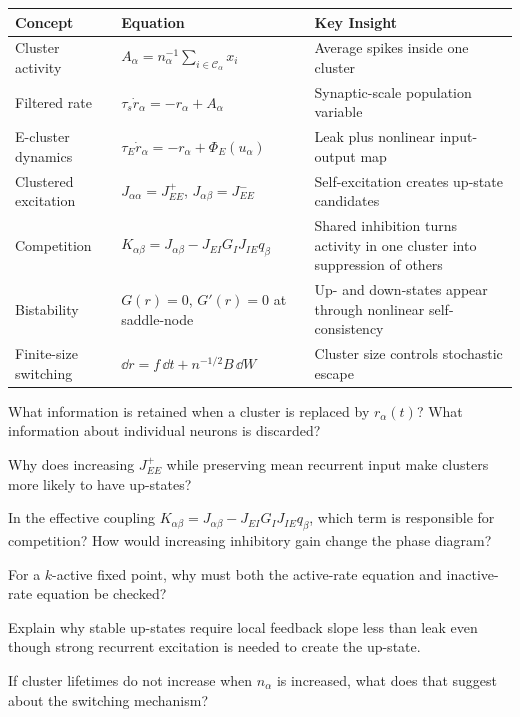 \begin{chaptersummary}

\begin{center}
\renewcommand{\arraystretch}{1.45}
\begin{tabularx}{\textwidth}{@{}l X X@{}}
  \toprule
  \textbf{Concept} & \textbf{Equation} & \textbf{Key Insight} \\
  \midrule
  Cluster activity &
  $A_{\alpha}=n_{\alpha}^{-1}\sum_{i\in\mathcal{C}_{\alpha}}x_i$ &
  Average spikes inside one cluster \\
  Filtered rate &
  $\tau_s\dot r_{\alpha}=-r_{\alpha}+A_{\alpha}$ &
  Synaptic-scale population variable \\
  E-cluster dynamics &
  $\tau_E\dot r_{\alpha}=-r_{\alpha}+\Phi_E(u_{\alpha})$ &
  Leak plus nonlinear input-output map \\
  Clustered excitation &
  $J_{\alpha\alpha}=J_{EE}^{+}$, $J_{\alpha\beta}=J_{EE}^{-}$ &
  Self-excitation creates up-state candidates \\
  Competition &
  $K_{\alpha\beta}=J_{\alpha\beta}-J_{EI}G_I J_{IE}q_{\beta}$ &
  Shared inhibition turns activity in one cluster into suppression of others \\
  Bistability &
  $G(r)=0$, $G'(r)=0$ at saddle-node &
  Up- and down-states appear through nonlinear self-consistency \\
  Finite-size switching &
  $\dd r=f\,\dd t+n^{-1/2}B\,\dd W$ &
  Cluster size controls stochastic escape \\
  \bottomrule
\end{tabularx}
\end{center}

\end{chaptersummary}

\begin{conceptquestions}
  \item What information is retained when a cluster is replaced by $r_{\alpha}(t)$? What information about individual neurons is discarded?

  \item Why does increasing $J_{EE}^{+}$ while preserving mean recurrent input make clusters more likely to have up-states?

  \item In the effective coupling $K_{\alpha\beta}=J_{\alpha\beta}-J_{EI}G_I J_{IE}q_{\beta}$, which term is responsible for competition? How would increasing inhibitory gain change the phase diagram?

  \item For a $k$-active fixed point, why must both the active-rate equation and inactive-rate equation be checked?

  \item Explain why stable up-states require local feedback slope less than leak even though strong recurrent excitation is needed to create the up-state.

  \item If cluster lifetimes do not increase when $n_{\alpha}$ is increased, what does that suggest about the switching mechanism?
\end{conceptquestions}
